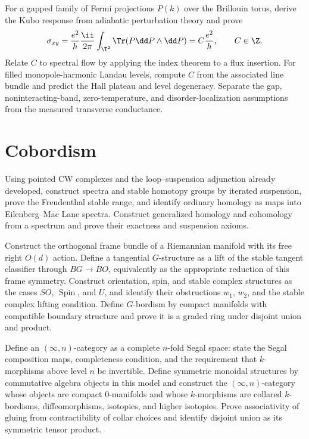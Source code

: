 \begin{exercise}
For a gapped family of Fermi projections $P(k)$ over the Brillouin torus,
derive the Kubo response from adiabatic perturbation theory and prove
\[
 \sigma_{xy}=\frac{e^2}{h}\frac{\ii}{2\pi}
 \int_{\T^2}\Tr(P\dd P\wedge\dd P)
 =C\frac{e^2}{h},\qquad C\in\Z.
\]
Relate $C$ to spectral flow by applying the index theorem to a flux insertion.
For filled monopole-harmonic Landau levels, compute $C$ from the associated
line bundle and predict the Hall plateau and level degeneracy.  Separate the
gap, noninteracting-band, zero-temperature, and disorder-localization
assumptions from the measured transverse conductance.
\end{exercise}

\section{Cobordism}

\begin{exercise}
Using pointed CW complexes and the loop--suspension adjunction already
developed, construct spectra and stable homotopy groups by iterated
suspension, prove the Freudenthal stable range, and identify ordinary
homology as maps into Eilenberg--Mac Lane spectra.  Construct generalized
homology and cohomology from a spectrum and prove their exactness and
suspension axioms.
\end{exercise}

\begin{exercise}
Construct the orthogonal frame bundle of a Riemannian manifold with its free
right $O(d)$ action.  Define a tangential $G$-structure as a lift of the
stable tangent classifier through $BG\to BO$, equivalently as the appropriate
reduction of this frame symmetry.  Construct orientation, spin, and stable
complex
structures as the cases $SO$, $\operatorname{Spin}$, and $U$, and identify
their obstructions $w_1$, $w_2$, and the stable complex lifting condition.
Define $G$-bordism by compact manifolds with compatible boundary structure
and prove it is a graded ring under disjoint union and product.
\end{exercise}

\begin{exercise}
Define an $(\infty,n)$-category as a complete $n$-fold Segal space: state the
Segal composition maps, completeness condition, and the requirement that
$k$-morphisms above level $n$ be invertible.  Define symmetric monoidal
structures by commutative algebra objects in this model and construct the
$(\infty,n)$-category whose objects are compact $0$-manifolds and whose
$k$-morphisms are collared $k$-bordisms, diffeomorphisms, isotopies, and
higher isotopies.  Prove associativity of gluing from contractibility of
collar choices and identify disjoint union as its symmetric tensor product.
\end{exercise}

